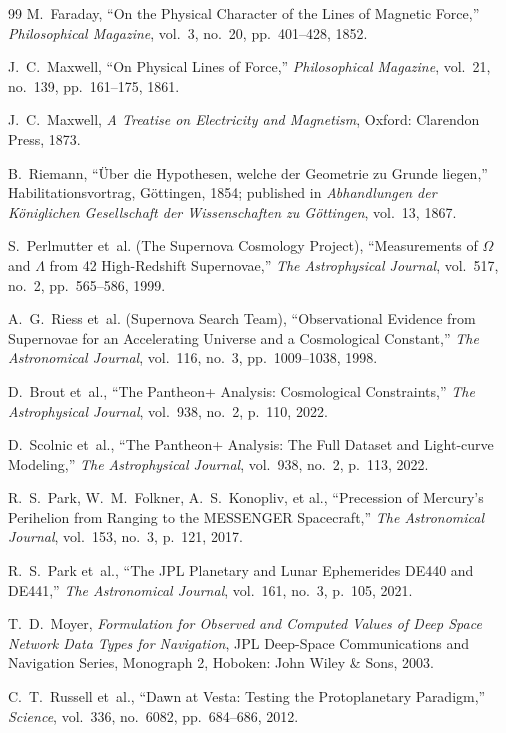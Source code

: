 \documentclass[11pt,a4paper]{article}
\begin{document}
\begin{thebibliography}{99}
M.~Faraday, ``On the Physical Character of the Lines of Magnetic Force,'' \textit{Philosophical Magazine}, vol.~3, no.~20, pp.~401--428, 1852.

J.~C.~Maxwell, ``On Physical Lines of Force,'' \textit{Philosophical Magazine}, vol.~21, no.~139, pp.~161--175, 1861.

J.~C.~Maxwell, \textit{A Treatise on Electricity and Magnetism}, Oxford: Clarendon Press, 1873.

B.~Riemann, ``{\"U}ber die Hypothesen, welche der Geometrie zu Grunde liegen,'' Habilitationsvortrag, G{\"o}ttingen, 1854; published in \textit{Abhandlungen der K{\"o}niglichen Gesellschaft der Wissenschaften zu G{\"o}ttingen}, vol.~13, 1867.

S.~Perlmutter et~al. (The Supernova Cosmology Project), ``Measurements of $\Omega$ and $\Lambda$ from 42 High-Redshift Supernovae,'' \textit{The Astrophysical Journal}, vol.~517, no.~2, pp.~565--586, 1999.

A.~G.~Riess et~al. (Supernova Search Team), ``Observational Evidence from Supernovae for an Accelerating Universe and a Cosmological Constant,'' \textit{The Astronomical Journal}, vol.~116, no.~3, pp.~1009--1038, 1998.

D.~Brout et~al., ``The Pantheon+ Analysis: Cosmological Constraints,'' \textit{The Astrophysical Journal}, vol.~938, no.~2, p.~110, 2022.

D.~Scolnic et~al., ``The Pantheon+ Analysis: The Full Dataset and Light-curve Modeling,'' \textit{The Astrophysical Journal}, vol.~938, no.~2, p.~113, 2022.

R.~S.~Park, W.~M.~Folkner, A.~S.~Konopliv, et al., ``Precession of Mercury's Perihelion from Ranging to the MESSENGER Spacecraft,'' \textit{The Astronomical Journal}, vol.~153, no.~3, p.~121, 2017.

R.~S.~Park et~al., ``The JPL Planetary and Lunar Ephemerides DE440 and DE441,'' \textit{The Astronomical Journal}, vol.~161, no.~3, p.~105, 2021.

T.~D.~Moyer, \textit{Formulation for Observed and Computed Values of Deep Space Network Data Types for Navigation}, JPL Deep-Space Communications and Navigation Series, Monograph 2, Hoboken: John Wiley \& Sons, 2003.

C.~T.~Russell et~al., ``Dawn at Vesta: Testing the Protoplanetary Paradigm,'' \textit{Science}, vol.~336, no.~6082, pp.~684--686, 2012.


\end{thebibliography}
\end{document}
